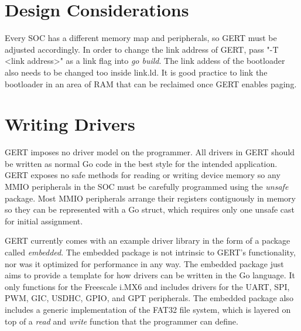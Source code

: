 \section{Design Considerations}
Every SOC has a different memory map and peripherals, so GERT must be adjusted
accordingly. In order to change the link address of GERT, pass "-T <link address>"
as a link flag into \textit{go build}. The link addess of the bootloader also needs
to be changed too inside link.ld. It is good practice to link the bootloader in an
area of RAM that can be reclaimed once GERT enables paging.

\section{Writing Drivers}
GERT imposes no driver model on the programmer. All drivers in
GERT should be written as normal Go code in the best style for
the intended application. GERT exposes no safe methods for reading
or writing device memory so any MMIO peripherals in the SOC must be
carefully programmed using the \textit{unsafe} package. Most MMIO
peripherals arrange their registers contiguously in memory so they
can be represented with a Go struct, which requires only one unsafe cast
for initial assignment.

GERT currently comes with an example driver
library in the form of a package called \textit{embedded}. The embedded package is not intrinsic to GERT's
functionality, nor was it optimized for performance in any way. The embedded package
just aims to provide a template for how drivers can be written in the Go language.
It only functions for the Freescale i.MX6 and includes drivers for the UART, SPI, PWM, GIC, USDHC, GPIO, and GPT peripherals.
The embedded package also includes a generic implementation of the FAT32 file system, which is
layered on top of a \textit{read} and \textit{write} function that the programmer can define.


